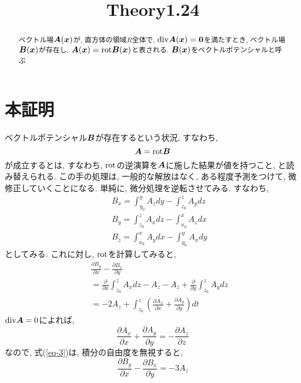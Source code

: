 \documentclass{jsarticle} \usepackage[dvipdfmx]{graphicx} \usepackage[dvipdfmx]{hyperref}
\title{Theory1.24}
\newcommand*{\mbold}[1]{\mbox{\boldmath $#1$}}
\newcommand*{\divg}{{\rm div}}
\newcommand*{\rot}{{\rm rot}}
\begin{document}
\maketitle

\begin{abstract}
  ベクトル場$\mbold{A}(\mbold{x})$が, 直方体の領域$R$全体で, $\divg \mbold{A}(\mbold{x}) = \mbold{0}$を満たすとき, ベクトル場$\mbold{B}(\mbold{x})$が存在し, 
  $\mbold{A}(\mbold{x}) = \rot \mbold{B}(\mbold{x})$と表される. 
  $\mbold{B}(\mbold{x})$をベクトルポテンシャルと呼ぶ
\end{abstract}

\section*{本証明}
ベクトルポテンシャル$\mbold{B}$が存在するという状況, すなわち, 
\begin{equation}
  \mbold{A} = \rot\mbold{B}
\end{equation}
が成立するとは, すなわち, $\rot$の逆演算を$\mbold{A}$に施した結果が値を持つこと, と読み替えられる. 
この手の処理は, 一般的な解放はなく, ある程度予測をつけて, 微修正していくことになる.  
単純に, 微分処理を逆転させてみる. 
すなわち, 
\begin{subequations}
  \begin{eqnarray}
    && B_x = \int_{y_0}^y A_z dy - \int_{z_0}^z A_y dz \\
    && B_y = \int_{z_0}^z A_x dz - \int_{x_0}^x A_z dx \\
    && B_z = \int_{x_0}^x A_y dx - \int_{y_0}^y A_x dy
  \end{eqnarray}
\end{subequations}
としてみる. これに対し, $\rot$を計算してみると, 
\begin{eqnarray}\label{eq-3}
  && \frac{\partial B_y}{\partial x} - \frac{\partial B_x}{\partial y} \nonumber \\
  && = \frac{\partial}{\partial x}\int_{z_0}^z A_x dz - A_z 
    - A_z + \frac{\partial}{\partial y}\int_{z_0}^z A_y dz \nonumber \\
  && = -2 A_z + \int_{z_0}^z \left(\frac{\partial A_x}{\partial x} + \frac{\partial A_y}{\partial y}\right)dt
\end{eqnarray}
$\divg\mbold{A} = 0$によれば, 
\[
  \frac{\partial A_x}{\partial x} + \frac{\partial A_y}{\partial y} = -\frac{\partial A_z}{\partial z}
\]
なので, 式(\ref{eq-3})は, 積分の自由度を無視すると,  
\begin{equation}
  \frac{\partial B_y}{\partial x} - \frac{\partial B_x}{\partial y}
  = -3 A_z
\end{equation}
\end{document}
